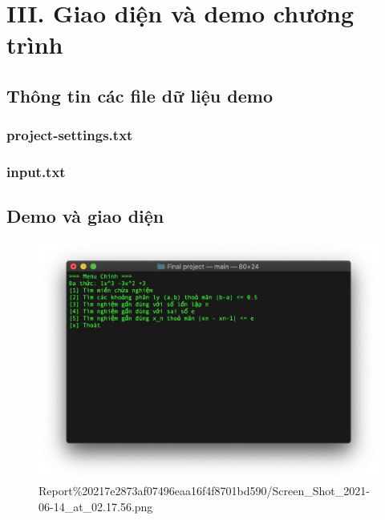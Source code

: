 \section{III. Giao diện và demo chương
trình}\label{iii.-giao-diux1ec7n-vuxe0-demo-chux1b0ux1a1ng-truxecnh}

\subsection{Thông tin các file dữ liệu
demo}\label{thuxf4ng-tin-cuxe1c-file-dux1eef-liux1ec7u-demo}

\subsubsection{project-settings.txt}\label{project-settings.txt}

\begin{Shaded}
\begin{Highlighting}[]
\end{Highlighting}
\end{Shaded}

\subsubsection{input.txt}\label{input.txt}

\begin{Shaded}
\begin{Highlighting}[]
 
 \NormalTok{-}
 
\end{Highlighting}
\end{Shaded}

\subsection{Demo và giao diện}\label{demo-vuxe0-giao-diux1ec7n}

\begin{figure}[htbp]
\centering
\includegraphics{Report 217e2873af07496eaa16f4f8701bd590/Screen_Shot_2021-06-14_at_02.17.56.png}
\caption{Report\%20217e2873af07496eaa16f4f8701bd590/Screen\_Shot\_2021-06-14\_at\_02.17.56.png}
\end{figure}

